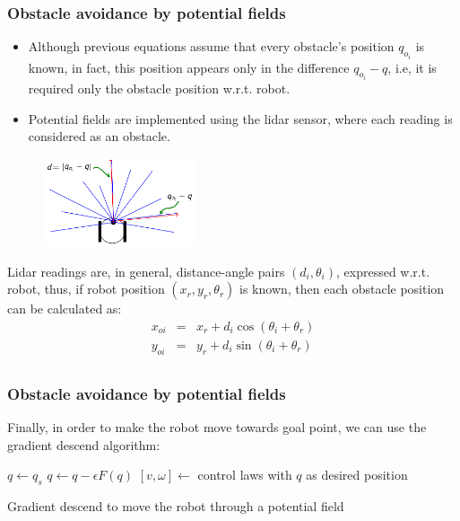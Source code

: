 \begin{frame}\frametitle{Obstacle avoidance by potential fields}
  \begin{itemize}
  \item Although previous equations assume that every obstacle's position $q_{o_i}$ is known, in fact, this position appears only in the difference $q_{o_i} - q$, i.e, it is required only the obstacle position w.r.t. robot.
  \item Potential fields are implemented using the lidar sensor, where each reading is considered as an obstacle. 
  \end{itemize}
  \begin{figure}
    \centering
    \includegraphics[width=0.4\textwidth]{Figures/MotionPlanning/PotFieldsLidar.png}
  \end{figure}
  Lidar readings are, in general, distance-angle pairs $(d_i,\theta_i)$, expressed w.r.t. robot, thus, if robot position $(x_r,y_r,\theta_r)$ is known, then each obstacle position can be calculated as:
  \begin{eqnarray*}
    x_{oi} &=& x_r + d_i\cos(\theta_i + \theta_r)\\
    y_{oi} &=& y_r + d_i\sin(\theta_i + \theta_r)\\
  \end{eqnarray*}
\end{frame}

\begin{frame}\frametitle{Obstacle avoidance by potential fields}
  Finally, in order to make the robot move towards goal point, we can use the gradient descend algorithm:
  \[\]
  \begin{algorithm}[H]
  \DontPrintSemicolon
  \;
$q \leftarrow q_s$\;
{
  $q \leftarrow q - \epsilon F(q)$\;
  $[v,\omega] \leftarrow $ control laws with $q$ as desired position\;
}
  \caption{Gradient descend to move the robot through a potential field}
  \label{alg:PotFields}
\end{algorithm}
\end{frame}

